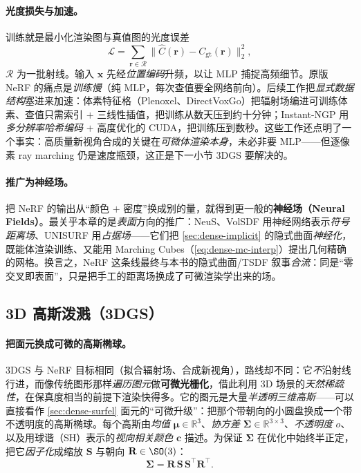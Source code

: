 \paragraph{光度损失与加速。}
训练就是最小化渲染图与真值图的光度误差
\begin{equation}
  \mathcal{L}=\sum_{\mathbf{r}\in\mathcal{R}}\bigl\|\hat{C}(\mathbf{r})-C_{\mathrm{gt}}(\mathbf{r})\bigr\|_2^2,
  \label{eq:dense-nerf-loss}
\end{equation}
$\mathcal{R}$ 为一批射线。输入 $\mathbf{x}$ 先经\emph{位置编码}升频，以让 MLP 捕捉高频细节。原版 NeRF 的痛点是\emph{训练慢}（纯 MLP，每次查值要全网络前向）。后续工作把\emph{显式数据结构}塞进来加速：体素特征格（Plenoxel、DirectVoxGo）把辐射场编进可训练体素、查值只需索引 $+$ 三线性插值，把训练从数天压到约十分钟；Instant-NGP\cite{mueller2022instantngp} 用\emph{多分辨率哈希编码} $+$ 高度优化的 CUDA，把训练压到数秒。这些工作还点明了一个事实：高质量新视角合成的关键在\emph{可微体渲染本身}，未必非要 MLP——但逐像素 ray marching 仍是速度瓶颈，这正是下一小节 3DGS 要解决的。

\paragraph{推广为神经场。}
把 NeRF 的输出从“颜色 $+$ 密度”换成别的量，就得到更一般的\textbf{神经场（Neural Fields）}。最关乎本章的是\emph{表面}方向的推广：NeuS\cite{wang2021neus}、VolSDF 用神经网络表示\emph{符号距离场}、UNISURF 用\emph{占据场}——它们把 \cref{sec:dense-implicit} 的隐式曲面\emph{神经化}，既能体渲染训练、又能用 Marching Cubes（\cref{eq:dense-mc-interp}）提出几何精确的网格。换言之，NeRF 这条线最终与本书的隐式曲面/TSDF 叙事\emph{合流}：同是“零交叉即表面”，只是把手工的距离场换成了可微渲染学出来的场。

\subsection{3D 高斯泼溅（3DGS）}
\label{sec:dense-radiance-gs}

\paragraph{把面元换成可微的高斯椭球。}
3DGS\cite{kerbl2023gaussian} 与 NeRF 目标相同（拟合辐射场、合成新视角），路线却不同：它\emph{不}沿射线行进，而像传统图形那样\emph{遍历图元}做\textbf{可微光栅化}，借此利用 3D 场景的\emph{天然稀疏性}，在保真度相当的前提下渲染快得多。它的图元是大量\emph{半透明三维高斯}——可以直接看作 \cref{sec:dense-surfel} 面元的“可微升级”：把那个带朝向的小圆盘换成一个带不透明度的高斯椭球。每个高斯由\emph{均值} $\boldsymbol{\mu}\in\mathbb{R}^3$、\emph{协方差} $\boldsymbol{\Sigma}\in\mathbb{R}^{3\times3}$、\emph{不透明度} $o$、以及用球谐（SH）表示的\emph{视向相关颜色} $\mathbf{c}$ 描述。为保证 $\boldsymbol{\Sigma}$ 在优化中始终半正定，把它\emph{因子化}成缩放 $\mathbf{S}$ 与朝向 $\mathbf{R}\in\SO(3)$：
\begin{equation}
  \boldsymbol{\Sigma}=\mathbf{R}\,\mathbf{S}\,\mathbf{S}^\top\mathbf{R}^\top.
  \label{eq:dense-gs-cov}
\end{equation}

